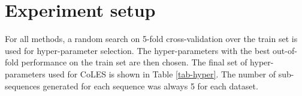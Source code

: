 \documentclass[sigconf]{acmart}
\begin{document}
\fi

\section{Experiment setup} \label{app-sec-exp-setup}

For all methods, a random search on 5-fold cross-validation over the train set is used for hyper-parameter selection. The hyper-parameters with the best out-of-fold performance on the train set are then chosen. The final set of hyper-parameters used for CoLES is shown in Table \ref{tab-hyper}. The number of sub-sequences generated for each sequence was always 5 for each dataset.
\end{document}
